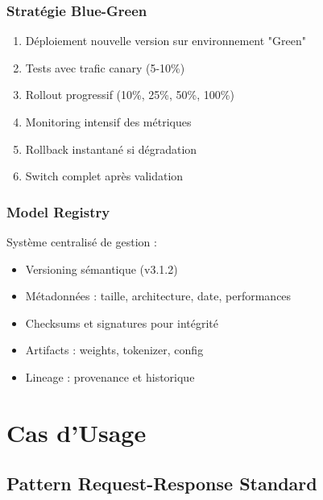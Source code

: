 \documentclass[12pt,a4paper]{article}
\begin{document}
\subsubsection{Stratégie Blue-Green}
\begin{tcolorbox}[
    enhanced,
    colback=info!5,
    colframe=info,
    boxrule=0pt,
    leftrule=4pt,
    sharp corners
]
\begin{enumerate}[leftmargin=*]
    \item Déploiement nouvelle version sur environnement "Green"
    \item Tests avec trafic canary (5-10\%)
    \item Rollout progressif (10\%, 25\%, 50\%, 100\%)
    \item Monitoring intensif des métriques
    \item Rollback instantané si dégradation
    \item Switch complet après validation
\end{enumerate}
\end{tcolorbox}

\subsubsection{Model Registry}
Système centralisé de gestion :
\begin{itemize}[leftmargin=*,label={\color{accent}\faDatabase}]
    \item Versioning sémantique (v3.1.2)
    \item Métadonnées : taille, architecture, date, performances
    \item Checksums et signatures pour intégrité
    \item Artifacts : weights, tokenizer, config
    \item Lineage : provenance et historique
\end{itemize}

\newpage
\section{ Cas d'Usage}

\subsection{Pattern Request-Response Standard}
\end{document}
